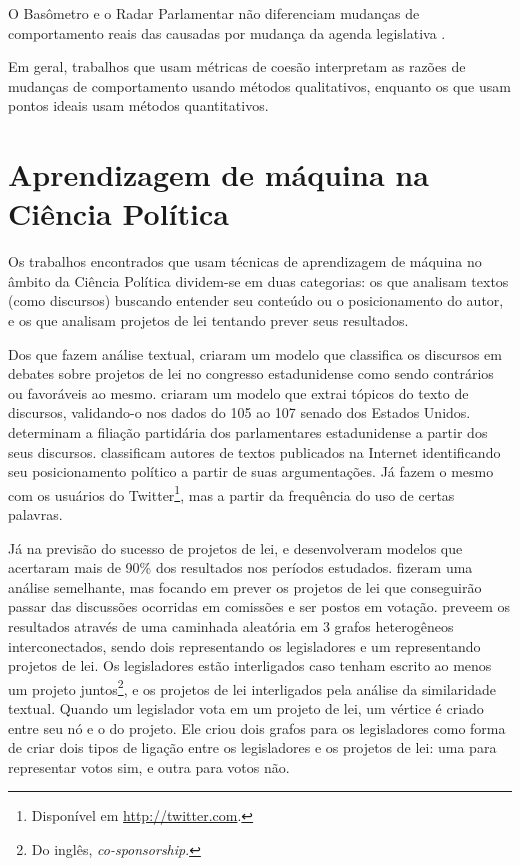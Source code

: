 O Basômetro e o Radar Parlamentar não diferenciam mudanças de comportamento
reais das causadas por mudança da agenda legislativa
\cite{Estadao2012,Trento2013}.

Em geral, trabalhos que usam métricas de coesão interpretam as razões de
mudanças de comportamento usando métodos qualitativos, enquanto os que usam
pontos ideais usam métodos quantitativos.

\section{Aprendizagem de máquina na Ciência Política}
\label{ref:trabalhos-relacionados:data-science-polsci}

Os trabalhos encontrados que usam técnicas de aprendizagem de máquina no
âmbito da Ciência Política dividem-se em duas categorias: os que analisam
textos (como discursos) buscando entender seu conteúdo ou o posicionamento do
autor, e os que analisam projetos de lei tentando prever seus resultados.

Dos que fazem análise textual,  criaram um modelo que
classifica os discursos em debates sobre projetos de lei no congresso
estadunidense como sendo contrários ou favoráveis ao mesmo.
 criaram um modelo que extrai tópicos do texto de
discursos, validando-o nos dados do 105\textordmasculine{} ao
107\textordmasculine{} senado dos Estados Unidos. 
determinam a filiação partidária dos parlamentares estadunidense a partir dos
seus discursos.  classificam autores de textos
publicados na Internet identificando seu posicionamento político a partir de
suas argumentações. Já  fazem o mesmo com os usuários do
Twitter\footnote{Disponível em \url{http://twitter.com}.}, mas a partir da
frequência do uso de certas palavras.

Já na previsão do sucesso de projetos de lei,  e
 desenvolveram modelos que acertaram mais de 90\% dos
resultados nos períodos estudados.  fizeram uma análise
semelhante, mas focando em prever os projetos de lei que conseguirão passar das
discussões ocorridas em comissões e ser postos em votação.
 preveem os resultados através de uma caminhada aleatória
em 3 grafos heterogêneos interconectados, sendo dois representando os
legisladores e um representando projetos de lei. Os legisladores estão
interligados caso tenham escrito ao menos um projeto juntos\footnote{Do inglês,
\emph{co-sponsorship}.}, e os projetos de lei interligados pela análise da
similaridade textual. Quando um legislador vota em um projeto de lei, um
vértice é criado entre seu nó e o do projeto. Ele criou dois grafos para os
legisladores como forma de criar dois tipos de ligação entre os legisladores e
os projetos de lei: uma para representar votos sim, e outra para votos não.


